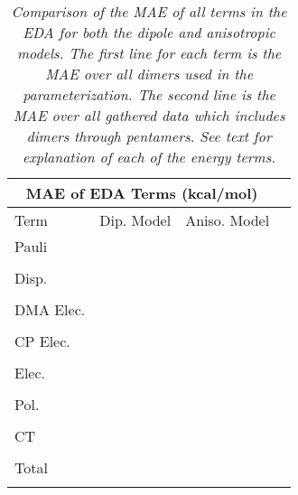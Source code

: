 \begin{table}[ht!]
    \begin{center}
    \begin{tabular}{lccc}
        \multicolumn{3}{c}{MAE of EDA Terms (kcal/mol)} \\\hline
        Term & Dip. Model & Aniso. Model \\\hline
        Pauli &  &  \\
        &  &  \\
        Disp. &  &  \\
        &  &  \\
        DMA Elec. &  &  \\
        &  &  \\
        CP Elec. &  &  \\
        &  &  \\
        Elec. &  &  \\
        &  &  \\
        Pol. &  &  \\
        &  &  \\
        CT &  &  \\
        &  &  \\\hline
        Total &  &  \\
        &  &  \\\hline
    \end{tabular}
    \end{center}
    \vspace{-3mm}
    \caption{\textit{Comparison of the MAE of all terms in the EDA for both the 
    dipole and anisotropic models. The first line for each term is the MAE over
    all dimers used in the parameterization. The second line is the MAE over
    all gathered data which includes dimers through pentamers. See text for explanation
    of each of the energy terms.}}
    \label{tab:mae}
\end{table}